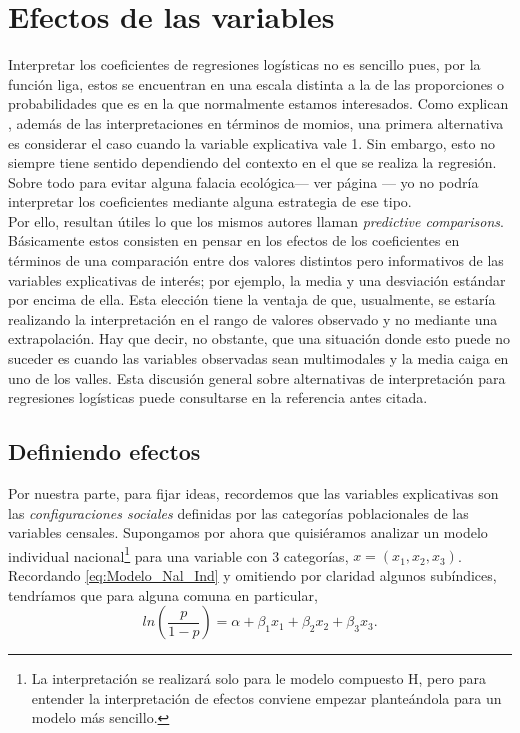 \section{Efectos de las variables}

Interpretar los coeficientes de regresiones logísticas no es sencillo pues, por la función liga, estos se encuentran en una escala distinta a la de las proporciones o probabilidades que es en la que normalmente estamos interesados. Como explican \textcite{GelmanHill06}, además de las interpretaciones en términos de momios, una primera alternativa es considerar el caso cuando la variable explicativa vale 1. Sin embargo, esto no siempre tiene sentido dependiendo del contexto en el que se realiza la regresión. Sobre todo para evitar alguna falacia ecológica--- ver página \pageref{No_Extrapolar}--- yo no podría interpretar los coeficientes mediante alguna estrategia de ese tipo.\\ 

 Por ello, resultan útiles lo que los mismos autores llaman \textit{predictive comparisons}. Básicamente estos consisten en pensar en los efectos de los coeficientes en términos de una comparación entre dos valores distintos pero informativos de las variables explicativas de interés; por ejemplo, la media y una desviación estándar por encima de ella. Esta elección tiene la ventaja de que, usualmente, se estaría realizando la interpretación en el rango de valores observado y no mediante una extrapolación. Hay que decir, no obstante, que una situación donde esto puede no suceder es cuando las variables observadas sean multimodales y la media caiga en uno de los valles. Esta discusión general sobre alternativas de interpretación para regresiones logísticas puede consultarse en la referencia antes citada.
 
\subsection{Definiendo efectos}

 Por nuestra parte, para fijar ideas, recordemos que las variables explicativas son las \textit{configuraciones sociales} definidas por las categorías poblacionales de las variables censales. Supongamos por ahora que quisiéramos analizar un modelo individual nacional\footnote{La interpretación se realizará solo para le modelo compuesto H, pero para entender la interpretación de efectos conviene empezar planteándola para un modelo más sencillo.} para una variable con 3 categorías, $x = (x_1,x_2,x_3)$. Recordando \eqref{eq:Modelo_Nal_Ind} y omitiendo por claridad algunos subíndices, tendríamos que para alguna comuna en particular,
\begin{equation*}
ln\left(\dfrac{p}{1-p}\right) = \alpha + \beta_1 x_1 + \beta_2 x_2 + \beta_3 x_3.
\end{equation*}

